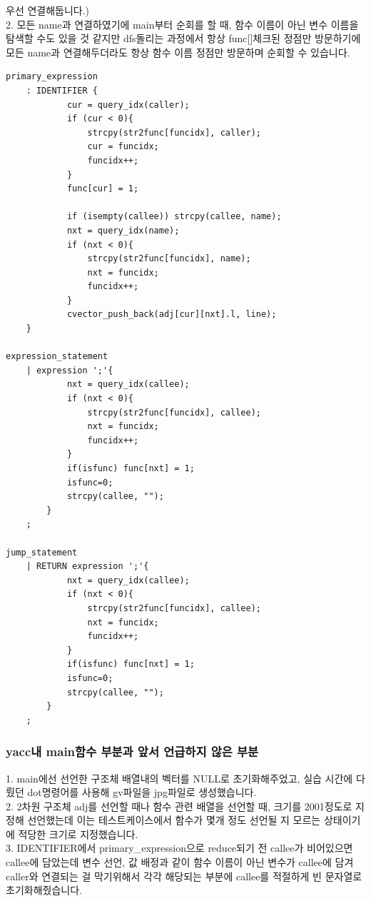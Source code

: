 \documentclass{article}
\begin{document}
				      우선 연결해둡니다.)\\
				  2. 모든 name과 연결하였기에 main부터 순회를 할 때, 함수 이름이 아닌 변수 이름을 탐색할 수도 있을 것 같지만 dfs돌리는 과정에서 항상 func[]체크된 정점만 방문하기에 모든 name과 연결해두더라도
				     항상 함수 이름 정점만 방문하며 순회할 수 있습니다.
			\begin{verbatim}
primary_expression
	: IDENTIFIER {
			cur = query_idx(caller);
            if (cur < 0){
                strcpy(str2func[funcidx], caller);
                cur = funcidx;
                funcidx++;                
            }
            func[cur] = 1;

			if (isempty(callee)) strcpy(callee, name);
			nxt = query_idx(name);
			if (nxt < 0){
				strcpy(str2func[funcidx], name);
				nxt = funcidx;
				funcidx++;
			}
			cvector_push_back(adj[cur][nxt].l, line);
    }
	
expression_statement
	| expression ';'{
			nxt = query_idx(callee);
			if (nxt < 0){
				strcpy(str2func[funcidx], callee);
				nxt = funcidx;
				funcidx++;
			}
			if(isfunc) func[nxt] = 1; 
			isfunc=0;
			strcpy(callee, "");
        }
	;

jump_statement
	| RETURN expression ';'{
			nxt = query_idx(callee);
			if (nxt < 0){
				strcpy(str2func[funcidx], callee);
				nxt = funcidx;
				funcidx++;
			}
			if(isfunc) func[nxt] = 1; 
			isfunc=0;
			strcpy(callee, "");
        }
	;
			\end{verbatim}

			\subsubsection{yacc내 main함수 부분과 앞서 언급하지 않은 부분}
			1. main에선 선언한 구조체 배열내의 벡터를 NULL로 초기화해주었고, 실습 시간에 다뤘던 dot명령어를 사용해 gv파일을 jpg파일로 생성했습니다.\\
			2. 2차원 구조체 adj를 선언할 때나 함수 관련 배열을 선언할 때, 크기를 2001정도로 지정해 선언했는데 이는 테스트케이스에서 함수가 몇개 정도 선언될 지 모르는 상태이기에 적당한 크기로 지정했습니다.\\
			3. IDENTIFIER에서 primary\_expression으로 reduce되기 전 callee가 비어있으면 callee에 담았는데 변수 선언, 값 배정과 같이 함수 이름이 아닌 변수가 callee에 담겨 caller와 연결되는 걸 막기위해서 각각 해당되는 부분에 callee를 적절하게 빈 문자열로 초기화해줬습니다.

			\newpage
\end{document}
